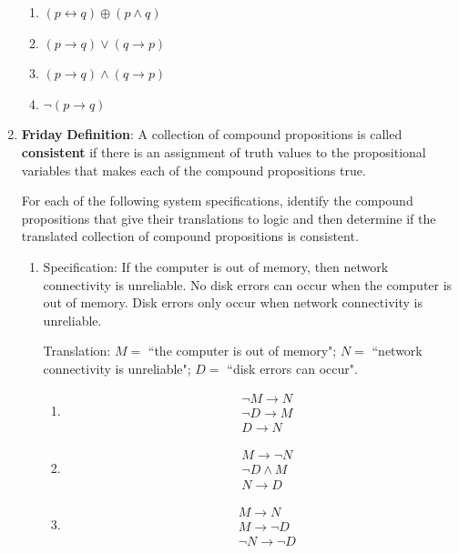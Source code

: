 \documentclass[12pt, oneside]{article}
\begin{document}
\begin{enumerate}
\begin{enumerate}
    \item $(p \leftrightarrow q) \oplus (p \land q)$
    \item $(p \to q) \vee (q \to p)$
    \item $(p \to q) \land (q \to p)$
    \item $\lnot (p \to q) $
\end{enumerate}
\item {\bf Friday} {\bf Definition}: A collection of  compound  propositions
is called {\bf consistent} if  there
is  an assignment  of  truth values
to  the  propositional variables that makes
each of the compound propositions  true.

For each of  the following  system specifications, 
identify the compound propositions  that give their
translations to logic  and then determine if the
translated collection  of compound
propositions is consistent.

\begin{enumerate}
    \item Specification: If the computer is out of memory, then network connectivity is unreliable. No disk errors can occur when the computer is out of memory. Disk
    errors only occur when network connectivity is unreliable.
    
    Translation: $M =$ ``the computer is  out of memory"; $N = $ ``network connectivity
    is unreliable"; $D = $  ``disk errors  can occur".
    
    \begin{enumerate}
        \item \begin{align*} &\neg M \to  N  \\ & \neg D \to M \\ & D \to N \end{align*}
        \item \begin{align*} &M \to  \neg N  \\ & \neg D \wedge M \\ & N \to D \end{align*}
        \item \begin{align*} &M \to  N  \\ &  M \to \neg D \\ & \neg  N \to \neg D \end{align*}
    \end{enumerate}
    

\end{enumerate}
\end{enumerate}
\end{document}
